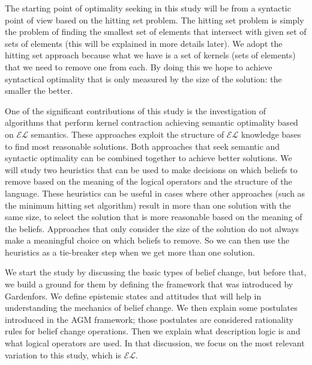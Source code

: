 The starting point of optimality seeking in this study will be from a syntactic point of view based on the hitting set problem. The hitting set problem is simply the problem of finding the smallest set of elements that intersect with given set of sets of elements (this will be explained in more details later). We adopt the hitting set approach because what we have is a set of kernels (sets of elements) that we need to remove one from each. By doing this we hope to achieve syntactical optimality that is only measured by the size of the solution: the smaller the better. 

One of the significant contributions of this study is the investigation of algorithms that perform kernel contraction achieving semantic optimality based on $\mathcal{EL}$ semantics. These approaches exploit the structure of $\mathcal{EL}$ knowledge bases to find most reasonable solutions. Both approaches that seek semantic and syntactic optimality can be combined together to achieve better solutions. We will study two heuristics that can be used to make decisions on which beliefs to remove based on the meaning of the logical operators and the structure of the language. These heuristics can be useful in cases where other approaches (such as the minimum hitting set algorithm) result in more than one solution with the same size, to select the solution that is more reasonable based on the meaning of the beliefs. Approaches that only consider the size of the solution do not always make a meaningful choice on which beliefs to remove. So we can then use the heuristics as a tie-breaker step when we get more than one solution.

We start the study by discussing the basic types of belief change, but before that, we build a ground for them by defining the framework that was introduced by Gardenfors. We define epistemic states and attitudes that will help in understanding the mechanics of belief change. We then explain some postulates introduced in the AGM framework; those postulates are considered rationality rules for belief change operations. Then we explain what description logic is and what logical operators are used. In that discussion, we focus on the most relevant variation to this study, which is $\mathcal{EL}$. 

